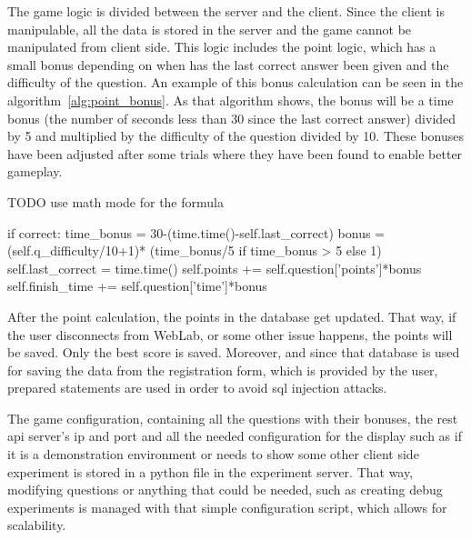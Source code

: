 The game logic is divided between the server and the client. Since the client is manipulable, all
the data is stored in the server and the game cannot be manipulated from client side. This logic
includes the point logic, which has a small bonus depending on when has the last correct answer been
given and the difficulty of the question. An example of this bonus calculation can be seen in the
algorithm~\ref{alg:point_bonus}. As that algorithm shows, the bonus will be a time bonus (the number
of seconds less than 30 since the last correct answer) divided by 5 and multiplied by the difficulty
of the question divided by 10. These bonuses have been adjusted after some trials where they have
been found to enable better gameplay.

TODO use math mode for the formula

\begin{center}
\begin{minipage}{.9\textwidth}
\singlespace
{}
\begin{pyglist}[language=python, caption={Point bonus calculation.},
	label={alg:point_bonus}, listingname={Algorithm}, numbers=left]
if correct:
    time_bonus = 30-(time.time()-self.last_correct)
    bonus = (self.q_difficulty/10+1)*
        (time_bonus/5 if time_bonus > 5 else 1)
    self.last_correct = time.time()
    self.points += self.question['points']*bonus
    self.finish_time += self.question['time']*bonus
\end{pyglist}
\end{minipage}
\end{center}

After the point calculation, the points in the database get updated. That way, if the user
disconnects from WebLab, or some other issue happens, the points will be saved. Only the best
score is saved. Moreover, and since that database is used for saving the data from the registration
form, which is provided by the user, prepared statements are used in order to avoid \acrshort{sql}
injection attacks.

The game configuration, containing all the questions with their bonuses, the \acrshort{rest}
\acrshort{api} server's \acrshort{ip} and port and all the needed configuration for the display such
as if it is a demonstration environment or needs to show some other client side experiment is stored
in a python file in the experiment server. That way, modifying questions or anything that could be
needed, such as creating debug experiments is managed with that simple configuration script, which
allows for scalability.

